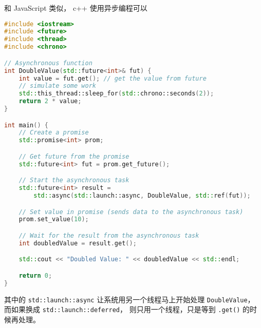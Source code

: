 
和 JavaScript 类似， c++ 使用异步编程可以

\begin{lstlisting}[language=cpp]
#include <iostream>
#include <future>
#include <thread>
#include <chrono>

// Asynchronous function
int DoubleValue(std::future<int>& fut) {
    int value = fut.get(); // get the value from future
    // simulate some work
    std::this_thread::sleep_for(std::chrono::seconds(2));
    return 2 * value;
}

int main() {
    // Create a promise
    std::promise<int> prom;

    // Get future from the promise
    std::future<int> fut = prom.get_future();

    // Start the asynchronous task
    std::future<int> result =
        std::async(std::launch::async, DoubleValue, std::ref(fut));

    // Set value in promise (sends data to the asynchronous task)
    prom.set_value(10);

    // Wait for the result from the asynchronous task
    int doubledValue = result.get();

    std::cout << "Doubled Value: " << doubledValue << std::endl;

    return 0;
}
\end{lstlisting}
其中的 \verb`std::launch::async` 让系统用另一个线程马上开始处理 \verb`DoubleValue`， 而如果换成 \verb`std::launch::deferred`， 则只用一个线程，只是等到 \verb`.get()` 的时候再处理。
